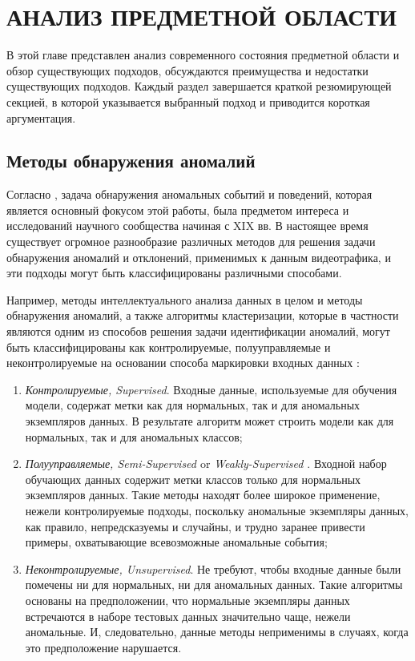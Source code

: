 \chapter{АНАЛИЗ ПРЕДМЕТНОЙ ОБЛАСТИ}
\label{ch:АНАЛИЗ ПРЕДМЕТНОЙ ОБЛАСТИ}

В этой главе представлен анализ современного состояния предметной области и обзор существующих подходов, обсуждаются преимущества и недостатки существующих подходов. Каждый раздел завершается краткой резюмирующей секцией, в которой указывается выбранный подход и приводится короткая аргументация.

\section{Методы обнаружения аномалий}

Согласно \cite{article:15_survey_ad}, задача обнаружения аномальных событий и поведений, которая является основный фокусом этой работы, была предметом интереса и исследований научного сообщества начиная с XIX вв. В настоящее время существует огромное разнообразие различных методов для решения задачи обнаружения аномалий и отклонений, применимых к данным видеотрафика, и эти подходы могут быть классифицированы различными способами.

Например, методы интеллектуального анализа данных в целом и методы обнаружения аномалий, а также алгоритмы кластеризации, которые в частности являются одним из способов решения задачи идентификации аномалий, могут быть классифицированы как контролируемые, полууправляемые и неконтролируемые на основании способа маркировки входных данных \cite{article:15_survey_ad} \cite{article:comp_analys_odt}:

\begin{enumerate}
	\setlength\itemsep{-0.5em}
	\item \textit{Контролируемые, Supervised}. Входные данные, используемые для обучения модели, содержат метки как для нормальных, так и для аномальных экземпляров данных. В результате алгоритм может строить модели как для нормальных, так и для аномальных классов;

	\item \textit{Полууправляемые, Semi-Supervised \cite{article:15_survey_ad}} or \textit{Weakly-Supervised \cite{article:5_survey_tbsa}}. Входной набор обучающих данных содержит метки классов только для нормальных экземпляров данных. Такие методы находят более широкое применение, нежели контролируемые подходы, поскольку аномальные экземпляры данных, как правило, непредсказуемы и случайны, и трудно заранее привести примеры, охватывающие всевозможные аномальные события;

	\item \textit{Неконтролируемые, Unsupervised}. Не требуют, чтобы входные данные были помечены ни для нормальных, ни для аномальных данных. Такие алгоритмы основаны на предположении, что нормальные экземпляры данных встречаются в наборе тестовых данных значительно чаще, нежели аномальные. И, следовательно, данные методы неприменимы в случаях, когда это предположение нарушается.

\end{enumerate}

